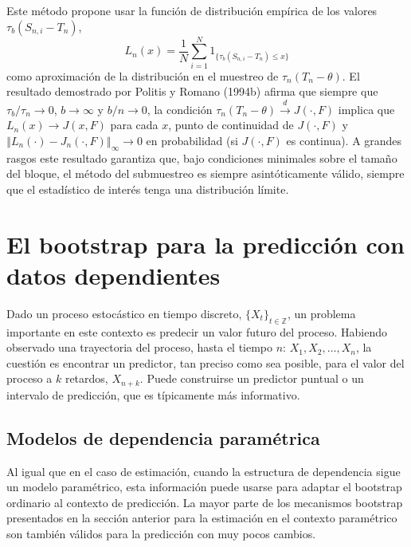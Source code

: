 \documentclass[
]{book}
\theoremstyle{break}
\theoremstyle{definition}
\theoremstyle{definition}
\theoremstyle{definition}
\theoremstyle{definition}
\theoremstyle{remark}
\begin{document}
Este método propone usar la función de distribución empírica de los
valores \(\tau _{b}(S_{n,i}-T_n)\),
\[L_n(x)=\frac{1}{N}\sum_{i=1}^{N}1_{\{\tau _{b}(S_{n,i}-T_n)\leq x\}}\]
como aproximación de la distribución en el muestreo de \(\tau_n(T_n-\theta )\).
El resultado demostrado por Politis y Romano (1994b) afirma que siempre que
\(\tau _{b}/\tau _n\rightarrow 0\), \(b \rightarrow \infty\) y
\(b/n\rightarrow 0\), la condición \(\tau _n(T_n-\theta )\overset{d}{\rightarrow}J(\cdot ,F)\) implica que \(L_n(x)\rightarrow J(x,F)\) para cada \(x\), punto de continuidad de \(J(\cdot ,F)\) y
\(\left\Vert L_n(\cdot )-J_n(\cdot ,F)\right\Vert _{\infty }\rightarrow 0\) en
probabilidad (si \(J(\cdot ,F)\) es continua). A grandes rasgos este
resultado garantiza que, bajo condiciones minimales sobre el tamaño del
bloque, el método del submuestreo es siempre asintóticamente válido,
siempre que el estadístico de interés tenga una distribución límite.

\hypertarget{el-bootstrap-para-la-predicciuxf3n-con-datos-dependientes}{%
\section{El bootstrap para la predicción con datos dependientes}\label{el-bootstrap-para-la-predicciuxf3n-con-datos-dependientes}}

Dado un proceso estocástico en tiempo discreto,
\(\{X_{t}\}_{t\in \mathbb{ Z}}\), un problema importante en este contexto es predecir un valor
futuro del proceso. Habiendo observado una trayectoria del proceso,
hasta el tiempo \(n\): \(X_1,X_2,\ldots ,X_n\), la cuestión es
encontrar un predictor, tan preciso como sea posible, para el valor del
proceso a \(k\) retardos,
\(X_{n+k}\). Puede construirse un predictor puntual o un intervalo de
predicción, que es típicamente más informativo.

\hypertarget{modelos-de-dependencia-paramuxe9trica}{%
\subsection{Modelos de dependencia paramétrica}\label{modelos-de-dependencia-paramuxe9trica}}

Al igual que en el caso de estimación, cuando la estructura de
dependencia sigue un modelo paramétrico, esta información puede usarse
para adaptar el bootstrap ordinario al contexto de predicción. La mayor
parte de los mecanismos bootstrap presentados en la sección anterior
para la estimación en el contexto paramétrico son también válidos para
la predicción con muy pocos cambios.
\end{document}

